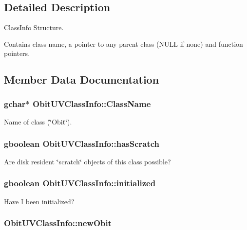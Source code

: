 \subsection{Detailed Description}
Class\-Info Structure. 

Contains class name, a pointer to any parent class (NULL if none) and function pointers. 



\subsection{Member Data Documentation}
\subsubsection{\setlength{\rightskip}{0pt plus 5cm}gchar$\ast$ {\bf Obit\-UVClass\-Info::Class\-Name}}\label{structObitUVClassInfo_o2}


Name of class (\char`\"{}Obit\char`\"{}). 

\subsubsection{\setlength{\rightskip}{0pt plus 5cm}gboolean {\bf Obit\-UVClass\-Info::has\-Scratch}}\label{structObitUVClassInfo_o1}


Are disk resident \char`\"{}scratch\char`\"{} objects of this class possible? 

\subsubsection{\setlength{\rightskip}{0pt plus 5cm}gboolean {\bf Obit\-UVClass\-Info::initialized}}\label{structObitUVClassInfo_o0}


Have I been initialized? 

\subsubsection{ {\bf Obit\-UVClass\-Info::new\-Obit}}\label{structObitUVClassInfo_o5}


